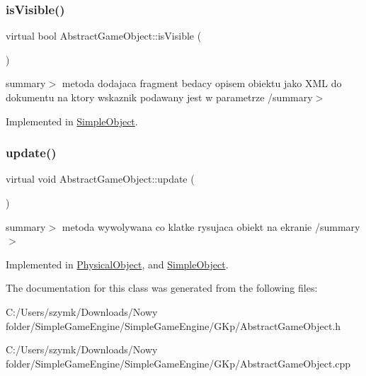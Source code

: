 \subsubsection{\texorpdfstring{is\+Visible()}{isVisible()}}
{\footnotesize\ttfamily virtual bool Abstract\+Game\+Object\+::is\+Visible (\begin{DoxyParamCaption}{ }\end{DoxyParamCaption})\hspace{0.3cm}{\ttfamily [pure virtual]}}

summary$>$ metoda dodajaca fragment bedacy opisem obiektu jako X\+ML do dokumentu na ktory wskaznik podawany jest w parametrze /summary$>$ 

Implemented in \hyperlink{class_simple_object_a2475d0a90f1cb7bc5765a632efe9ddd4}{Simple\+Object}.

\mbox{\label{class_abstract_game_object_a162f800603ac5671ff24ad8042c062b5}} 
\subsubsection{\texorpdfstring{update()}{update()}}
{\footnotesize\ttfamily virtual void Abstract\+Game\+Object\+::update (\begin{DoxyParamCaption}{ }\end{DoxyParamCaption})\hspace{0.3cm}{\ttfamily [pure virtual]}}

summary$>$ metoda wywolywana co klatke rysujaca obiekt na ekranie /summary$>$ 

Implemented in \hyperlink{class_physical_object_a3005ac0afce838049101db17525f6004}{Physical\+Object}, and \hyperlink{class_simple_object_a38a3ceafd11a673fd68dd87ed6ebd35b}{Simple\+Object}.



The documentation for this class was generated from the following files\+:\begin{DoxyCompactItemize}
\item 
C\+:/\+Users/szymk/\+Downloads/\+Nowy folder/\+Simple\+Game\+Engine/\+Simple\+Game\+Engine/\+G\+Kp/Abstract\+Game\+Object.\+h\item 
C\+:/\+Users/szymk/\+Downloads/\+Nowy folder/\+Simple\+Game\+Engine/\+Simple\+Game\+Engine/\+G\+Kp/Abstract\+Game\+Object.\+cpp\end{DoxyCompactItemize}
